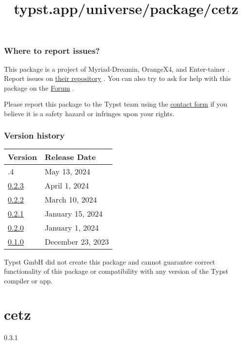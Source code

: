 \subsubsection{Where to report issues?}\label{where-to-report-issues}

This package is a project of Myriad-Dreamin, OrangeX4, and Enter-tainer
. Report issues on \href{https://github.com/mitex-rs/mitex}{their
repository} . You can also try to ask for help with this package on the
\href{https://forum.typst.app}{Forum} .

Please report this package to the Typst team using the
\href{https://typst.app/contact}{contact form} if you believe it is a
safety hazard or infringes upon your rights.

\label{versions}
\subsubsection{Version history}\label{version-history}

\begin{longtable}[]{@{}ll@{}}
\toprule\noalign{}
Version & Release Date \\
\midrule\noalign{}
\endhead
\bottomrule\noalign{}
\endlastfoot
0.2.4 & May 13, 2024 \\
\href{https://typst.app/universe/package/mitex/0.2.3/}{0.2.3} & April 1,
2024 \\
\href{https://typst.app/universe/package/mitex/0.2.2/}{0.2.2} & March
10, 2024 \\
\href{https://typst.app/universe/package/mitex/0.2.1/}{0.2.1} & January
15, 2024 \\
\href{https://typst.app/universe/package/mitex/0.2.0/}{0.2.0} & January
1, 2024 \\
\href{https://typst.app/universe/package/mitex/0.1.0/}{0.1.0} & December
23, 2023 \\
\end{longtable}

Typst GmbH did not create this package and cannot guarantee correct
functionality of this package or compatibility with any version of the
Typst compiler or app.


\title{typst.app/universe/package/cetz}

\label{banner}
\section{cetz}\label{cetz}

{ 0.3.1 }

